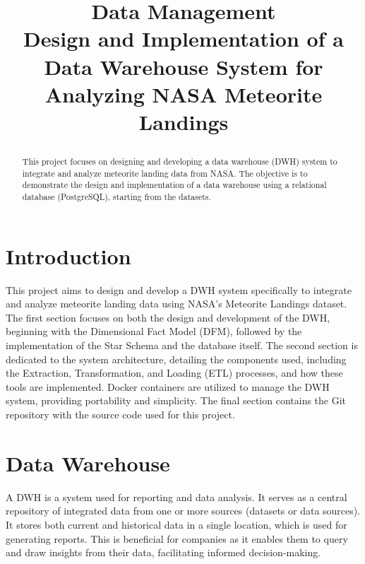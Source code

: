 \documentclass[conference]{IEEEtran}
\begin{document}
	
	\title{Data Management \\Design and Implementation of a Data Warehouse System for Analyzing NASA Meteorite Landings
		
	}
	
	\author{
	}
	\maketitle
	
	\begin{abstract}
			This project focuses on designing and developing a data warehouse (DWH) system to integrate and analyze meteorite landing data from NASA. The objective is to demonstrate the design and implementation of a data warehouse using a relational database (PostgreSQL), starting from the datasets.
	\end{abstract}
	
	\section{Introduction}
	
	This project aims to design and develop a DWH system specifically to integrate and analyze meteorite landing data using NASA's Meteorite Landings dataset. The first section focuses on both the design and development of the DWH, beginning with the Dimensional Fact Model (DFM), followed by the implementation of the Star Schema and the database itself. The second section is dedicated to the system architecture, detailing the components used, including the Extraction, Transformation, and Loading (ETL) processes, and how these tools are implemented. Docker containers are utilized to manage the DWH system, providing portability and simplicity. The final section contains the Git repository with the source code used for this project.
	
	\section{Data Warehouse}
	A DWH is a system used for reporting and data analysis. It serves as a central repository of integrated data from one or more sources (datasets or data sources). It stores both current and historical data in a single location, which is used for generating reports. This is beneficial for companies as it enables them to query and draw insights from their data, facilitating informed decision-making.
\end{document}
